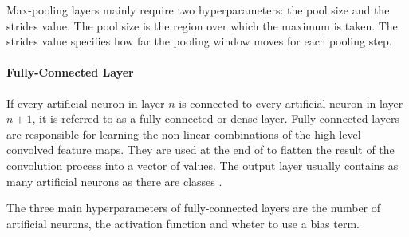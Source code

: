 Max-pooling layers mainly require two hyperparameters: the pool size and the strides value.
The pool size is the region over which the maximum is taken.
The strides value specifies how far the pooling window moves for each pooling step.

\paragraph{Fully-Connected Layer}
If every artificial neuron in layer $n$ is connected to every artificial neuron in layer $n + 1$, it is referred to as a fully-connected or dense layer.
Fully-connected layers are responsible for learning the non-linear combinations of the high-level convolved feature maps.
They are used at the end of  to flatten the result of the convolution process into a vector of values.
The output layer usually contains as many artificial neurons as there are classes \cite{cnn_fc}.

The three main hyperparameters of fully-connected layers are the number of artificial neurons, the activation function and wheter to use a bias term.
